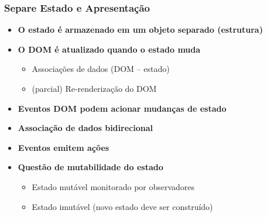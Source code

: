 \documentclass{beamer}
\begin{document}
\begin{frame}
      \frametitle{Separe Estado e Apresentação}

      \begin{itemize}
            \item \textbf{O estado é armazenado em um objeto separado (estrutura)}

            \item \textbf{O DOM é atualizado quando o estado muda}
                  \begin{itemize}
                        \item Associações de dados (DOM – estado)
                        \item (parcial) Re-renderização do DOM
                  \end{itemize}

            \item \textbf{Eventos DOM podem acionar mudanças de estado}

            \item \textbf{Associação de dados bidirecional}

            \item \textbf{Eventos emitem ações}

            \item \textbf{Questão de mutabilidade do estado}
                  \begin{itemize}
                        \item Estado mutável monitorado por observadores
                        \item Estado imutável (novo estado deve ser construído)
                  \end{itemize}
      \end{itemize}

\end{frame}
\end{document}
